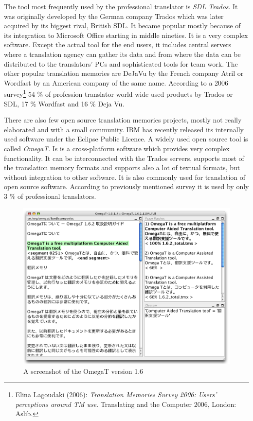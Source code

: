 The tool most frequently used by the professional translator is \emph{SDL Trados}. It was originally developed by the German company Trados which was later acquired by its biggest rival, British SDL. It became popular mostly because of its integration to Microsoft Office starting in middle nineties. It is a very complex software. Except the actual tool for the end users, it includes central servers where a translation agency can gather its data and from where the data can be distributed to the translators' PCs and sophisticated tools for team work. The other popular translation memories are DeJaVu by the French company Atril or Wordfast by an American company of the same name. According to a 2006 survey\footnote{Elina Lagoudaki (2006): \emph{Translation Memories Survey 2006: Users' perceptions around TM use}. Translating and the Computer 2006, London: Aslib.} 54 \% of profession translator world wide used products by Trados or SDL, 17 \% Wordfast and 16 \% Deja Vu.

There are also few open source translation memories projects, mostly not really elaborated and with a small community. IBM has recently released its internally used software under the Eclipse Public Licence. A widely used open source tool is called \emph{OmegaT}. Is is a cross-platform software which provides very complex functionality. It can be interconnected with the Trados servers, supports most of the translation memory formats and supports also a lot of textual formats, but without integration to other software. It is also commonly used for translation of open source software. According to previously mentioned survey it is used by only 3 \% of professional translators.

\begin{figure}
\begin{center}
\includegraphics[scale=.4]{./figures/omegat.png}
\end{center}

\caption{A screenshot of the OmegaT version 1.6}

\end{figure}

